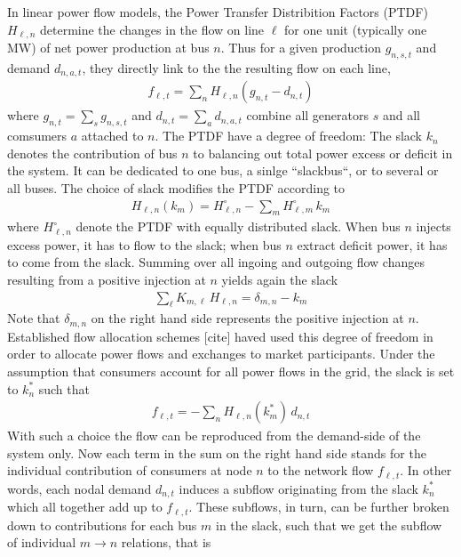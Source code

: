 \documentclass[11pt,twocolumn]{article}
\newcommand{\generation}[1][n]{g_{#1,s,t}}
\newcommand{\nodalgeneration}[1][n]{g_{#1,t}}
\newcommand{\demand}[1][n]{d_{#1,a,t}}
\newcommand{\nodaldemand}[1][n]{d_{#1,t}}
\newcommand{\incidence}[1][n]{K_{#1,\ell}}
\newcommand{\ptdf}[1][n]{H_{\ell,#1}}
\newcommand{\ptdfEqual}[1][n]{\ptdf[#1]^\circ}
\newcommand{\slack}[1][n]{k_{#1}}
\newcommand{\slackk}[1][n]{k^*_{#1}}
\newcommand{\flow}{f_{\ell,t}}
\begin{document}
In linear power flow models, the Power Transfer Distribition Factors (PTDF) $\ptdf$ determine the changes in the flow on line $\ell$ for one unit (typically one MW) of net power production at bus $n$. Thus for a given production $\generation$ and demand $\demand$, they directly link to the the resulting flow on each line, 
\begin{align}
\flow  =   \sum_n \ptdf  \left( \nodalgeneration- \nodaldemand \right)    
\label{eq:flow_from_ptdf}
\end{align}
where $\nodalgeneration = \sum_s \generation$ and $\nodaldemand = \sum_a \demand$ combine all generators $s$ and all comsumers $a$ attached to $n$.
The PTDF have a degree of freedom: The slack $\slack$ denotes the contribution of bus $n$ to balancing out total power excess or deficit in the system. It can be dedicated to one bus, a sinlge ``slackbus``, or to several or all buses. The choice of slack modifies the PTDF according to 
\begin{align}
\ptdf\left( \slack[m]\right)  = \ptdfEqual - \sum_m \ptdfEqual[m]  \, \slack[m]
\label{eq:ptdf_slacked}
\end{align}
where $\ptdfEqual$ denote the PTDF with equally distributed slack.
When bus $n$ injects excess power, it has to flow to the slack; when bus $n$ extract deficit power, it has to come from the slack. Summing over all ingoing and outgoing flow changes resulting from a positive injection at $n$ yields again the slack 
\begin{align}
\sum_\ell \incidence[m] \, \ptdf =  \delta_{m,n} - \slack[m] 
\label{eq:slack}
\end{align}
Note that $\delta_{m,n}$ on the right hand side represents the positive injection at $n$.
Established flow allocation schemes [cite] haved used this degree of freedom in order to allocate power flows and exchanges to market participants. Under the assumption that consumers account for all power flows in the grid, the slack is set to $\slack^*$ such that 
\begin{align}
\flow  = - \sum_n \ptdf\left( \slackk[m]\right) \, \nodaldemand  
\label{eq:flow_from_demand}
\end{align}
With such a choice the flow can be reproduced from the demand-side of the system only. Now each term in the sum on the right hand side stands for the individual contribution of consumers at node $n$ to the network flow $\flow$. In other words, each nodal demand $\nodaldemand$ induces a subflow originating from the slack $\slackk$ which all together add up to $\flow$. These subflows, in turn, can be further broken down to contributions for each bus $m$ in the slack, such that we get the subflow of individual $m \rightarrow n$ relations, that is 
\end{document}
